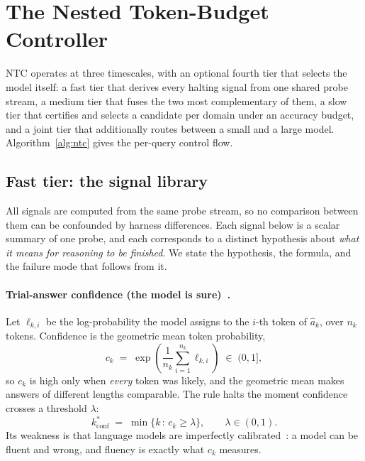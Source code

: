 \documentclass[acmsmall]{acmart}
\theoremstyle{acmdefinition}%
\theoremstyle{acmplain}}{}%
\begin{document}
\section{The Nested Token-Budget Controller}\label{sec:method}

NTC operates at three timescales, with an optional fourth tier that selects the model itself: a fast tier that derives every halting signal from one shared probe stream, a medium tier that fuses the two most complementary of them, a slow tier that certifies and selects a candidate per domain under an accuracy budget, and a joint tier that additionally routes between a small and a large model. Algorithm~\ref{alg:ntc} gives the per-query control flow.



\subsection{Fast tier: the signal library}
All signals are computed from the same probe stream, so no comparison between them can be confounded by harness differences. Each signal below is a scalar summary of one probe, and each corresponds to a distinct hypothesis about \emph{what it means for reasoning to be finished}. We state the hypothesis, the formula, and the failure mode that follows from it.

\paragraph{Trial-answer confidence (the model is sure)~\cite{yang2025deer}.}
Let $\ell_{k,i}$ be the log-probability the model assigns to the $i$-th token of $\hat a_k$, over $n_k$ tokens. Confidence is the geometric mean token probability,
\begin{equation}
c_k \;=\; \exp\!\left(\frac{1}{n_k}\sum_{i=1}^{n_k} \ell_{k,i}\right) \;\in\; (0,1],
\label{eq:conf}
\end{equation}
so $c_k$ is high only when \emph{every} token was likely, and the geometric mean makes answers of different lengths comparable. The rule halts the moment confidence crosses a threshold $\lambda$:
\begin{equation}
k^\ast_{\mathrm{conf}} \;=\; \min\{k \,:\, c_k \geq \lambda\}, \qquad \lambda \in (0,1).
\label{eq:deer}
\end{equation}
Its weakness is that language models are imperfectly calibrated~\cite{kadavath2022language,desai2020calibration}: a model can be fluent and wrong, and fluency is exactly what $c_k$ measures.
\end{document}
